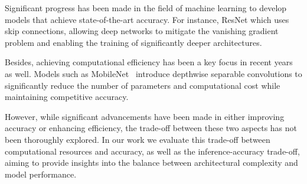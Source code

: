Significant progress has been made in the field of machine learning to develop models that achieve state-of-the-art accuracy. For instance, ResNet \cite{He_2016_CVPR} which uses skip connections, allowing deep networks to mitigate the vanishing gradient problem and enabling the training of significantly deeper architectures.

Besides, achieving computational efficiency has been a key focus in recent years as well. Models such as MobileNet~\cite{DBLP:journals/corr/HowardZCKWWAA17} introduce depthwise separable convolutions to significantly reduce the number of parameters and computational cost while maintaining competitive accuracy.

However, while significant advancements have been made in either improving accuracy or enhancing efficiency, the trade-off between these two aspects has not been thoroughly explored. In our work we evaluate this trade-off between computational resources and accuracy, as well as the inference-accuracy trade-off, aiming to provide insights into the balance between architectural complexity and model performance.









